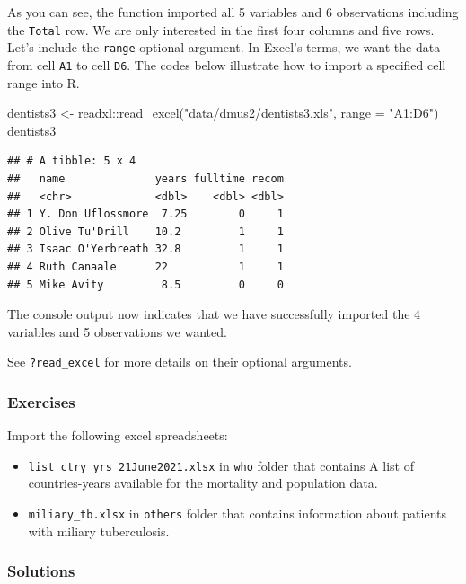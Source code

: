 \documentclass[
]{book}
\newenvironment{Shaded}{\begin{snugshade}}{\end{snugshade}}
\newcommand{\AttributeTok}[1]{\textcolor[rgb]{0.77,0.63,0.00}{#1}}
\newcommand{\FunctionTok}[1]{\textcolor[rgb]{0.00,0.00,0.00}{#1}}
\newcommand{\NormalTok}[1]{#1}
\newcommand{\OtherTok}[1]{\textcolor[rgb]{0.56,0.35,0.01}{#1}}
\newcommand{\SpecialCharTok}[1]{\textcolor[rgb]{0.00,0.00,0.00}{#1}}
\newcommand{\StringTok}[1]{\textcolor[rgb]{0.31,0.60,0.02}{#1}}
\providecommand{\tightlist}{%
  \setlength{\itemsep}{0pt}\setlength{\parskip}{0pt}}
\begin{document}
As you can see, the function imported all 5 variables and 6 observations including the \texttt{Total} row. We are only interested in the first four columns and five rows. Let's include the \texttt{range} optional argument. In Excel's terms, we want the data from cell \texttt{A1} to cell \texttt{D6}. The codes below illustrate how to import a specified cell range into R.

\begin{Shaded}
\begin{Highlighting}[]
\NormalTok{dentists3 }\OtherTok{\textless{}{-}}\NormalTok{ readxl}\SpecialCharTok{::}\FunctionTok{read\_excel}\NormalTok{(}\StringTok{"data/dmus2/dentists3.xls"}\NormalTok{, }\AttributeTok{range =} \StringTok{"A1:D6"}\NormalTok{)}
\NormalTok{dentists3}
\end{Highlighting}
\end{Shaded}

\begin{verbatim}
## # A tibble: 5 x 4
##   name              years fulltime recom
##   <chr>             <dbl>    <dbl> <dbl>
## 1 Y. Don Uflossmore  7.25        0     1
## 2 Olive Tu'Drill    10.2         1     1
## 3 Isaac O'Yerbreath 32.8         1     1
## 4 Ruth Canaale      22           1     1
## 5 Mike Avity         8.5         0     0
\end{verbatim}

The console output now indicates that we have successfully imported the 4 variables and 5 observations we wanted.

See \texttt{?read\_excel} for more details on their optional arguments.

\hypertarget{exercises-1}{%
\subsubsection{Exercises}\label{exercises-1}}

Import the following excel spreadsheets:

\begin{itemize}
\tightlist
\item
  \texttt{list\_ctry\_yrs\_21June2021.xlsx} in \texttt{who} folder that contains A list of countries-years available for the mortality and population data.
\item
  \texttt{miliary\_tb.xlsx} in \texttt{others} folder that contains information about patients with miliary tuberculosis.
\end{itemize}

\hypertarget{solutions-1}{%
\subsubsection{Solutions}\label{solutions-1}}
\end{document}
